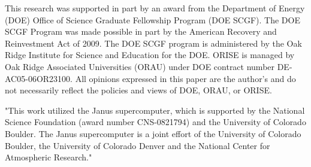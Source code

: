 \documentclass{PoS}
\begin{document}
This research was supported in part by an award from the Department of Energy (DOE) Office of Science Graduate Fellowship Program (DOE SCGF).
The DOE SCGF Program was made possible in part by the American Recovery and Reinvestment Act of 2009.
The DOE SCGF program is administered by the Oak Ridge Institute for Science and Education for the DOE.
ORISE is managed by Oak Ridge Associated Universities (ORAU) under DOE contract number DE-AC05-06OR23100.
All opinions expressed in this paper are the author's and do not necessarily reflect the policies and views of DOE, ORAU, or ORISE.

"This work utilized the Janus supercomputer, which is supported by the National Science Foundation (award number CNS-0821794) and the University of Colorado Boulder.
The Janus supercomputer is a joint effort of the University of Colorado Boulder, the University of Colorado Denver and the National Center for Atmospheric Research."
\end{document}
